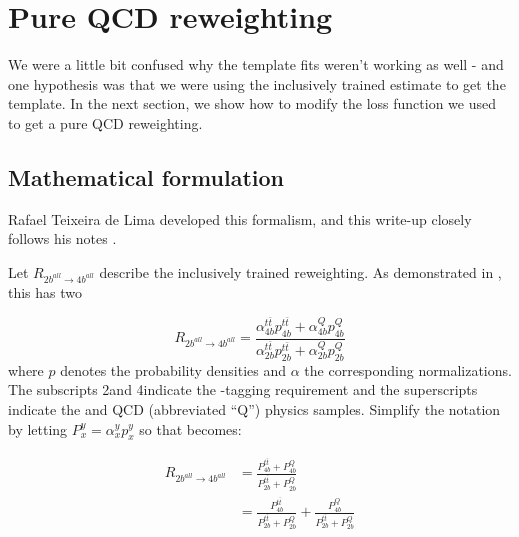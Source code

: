 \FloatBarrier
\section{Pure QCD reweighting}
\label{pure-qcd}
We were a little bit confused why the template fits weren't working as well - and one hypothesis was that we were using the inclusively trained estimate to get the \ttbar template. In the next section, we show how to modify the loss function we used to get a pure QCD reweighting.

\subsection{Mathematical formulation}
\label{pure-qcd-math}

Rafael Teixeira de Lima developed this formalism, and this write-up closely follows his notes \cite{pure-qcd-Rafael}.

Let $R_{2b^{all} \rightarrow 4b^{all}}$  describe the inclusively trained reweighting. 
As demonstrated in \Fig{\ref{fig:ttbar-rw-graphic}}, this has two

\begin{equation}
R_{2b^{all} \rightarrow 4b^{all}} = \frac{\alpha_{4b}^{t\bar{t}} p_{4b}^{t\bar{t}} +  \alpha_{4b}^{Q} p_{4b}^{Q} }{ \alpha_{2b}^{t\bar{t}} p_{2b}^{t\bar{t}} +  \alpha_{2b}^{Q} p_{2b}^{Q}  }
\label{eq:rw-incl-defn}
\end{equation}
\noindent
where $p$ denotes the probability densities and $\alpha$ the corresponding normalizations. The subscripts 2\Pqb and 4\Pqb indicate the \Pqb-tagging requirement and the superscripts indicate 
the \ttbar and QCD (abbreviated ``Q'') physics samples.
Simplify the notation by letting $P_x^y = \alpha_x^y p_x^y$  so that \Eq{\ref{eq:rw-incl-defn}} becomes:


\begin{align*}
R_{2b^{all} \rightarrow 4b^{all}} &= \frac{P_{4b}^{t\bar{t}} +  P_{4b}^{Q} }{ P_{2b}^{t\bar{t}} +  P_{2b}^{Q}  } \\
&= \frac{P_{4b}^{t\bar{t}}}{ P_{2b}^{t\bar{t}} +  P_{2b}^{Q}  }  + \frac{P_{4b}^{Q} }{ P_{2b}^{t\bar{t}} +  P_{2b}^{Q}  }
\label{eq:rw-incl-short}
\end{align*}

